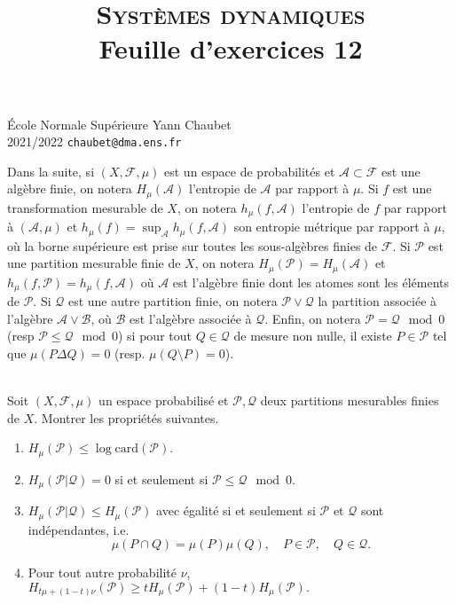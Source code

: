 \documentclass[a4paper,10pt,openany]{article}
\title{\textsc{Syst\`emes dynamiques} \\ Feuille d'exercices 12}
\date{}
\author{}
\theoremstyle{plain}
\theoremstyle{definition}
\begin{document}
{\noindent \'Ecole Normale Sup\'erieure  \hfill Yann Chaubet } \\
{2021/2022 \hfill \texttt{chaubet@dma.ens.fr}}

{\let\newpage\relax\maketitle}
\maketitle

Dans la suite, si $(X, \mathcal{F}, \mu)$ est un espace de probabilit\'es et $\mathcal{A} \subset \mathcal{F}$ est une alg\`ebre finie, on notera $H_\mu(\mathcal{A})$ l'entropie de $\mathcal{A}$ par rapport \`a $\mu$. Si $f$ est une transformation mesurable de $X$, on notera $h_\mu(f, \mathcal{A})$ l'entropie de $f$ par rapport \`a $(\mathcal{A},\mu)$ et $h_\mu(f) = \sup_{\mathcal{A}} h_\mu(f,\mathcal{A})$ son entropie m\'etrique par rapport \`a $\mu$, o\`u la borne sup\'erieure est prise sur toutes les sous-alg\`ebres finies de $\mathcal{F}$. Si $\mathcal{P}$ est une partition mesurable finie de $X$, on notera $H_\mu(\mathcal{P}) = H_\mu(\mathcal{A})$ et $h_\mu(f, \mathcal{P}) = h_\mu(f, \mathcal{A})$ o\`u $\mathcal{A}$ est l'alg\`ebre finie dont les atomes sont les \'el\'ements de $\mathcal{P}$. Si $\mathcal{Q}$ est une autre partition finie, on notera $\mathcal{P} \vee \mathcal{Q}$ la partition associ\'ee \`a l'alg\`ebre $\mathcal{A} \vee \mathcal{B}$, o\`u $\mathcal{B}$ est l'alg\`ebre associ\'ee \`a $\mathcal{Q}$. Enfin, on notera $\mathcal{P} = \mathcal{Q} \mod 0$ (resp $\mathcal{P} \leq \mathcal{Q} \mod 0$) si pour tout $Q \in \mathcal{Q}$ de mesure non nulle, il existe $P \in \mathcal{P}$ tel que $\mu(P \Delta Q) = 0$ (resp. $\mu(Q \setminus P) = 0$).
 \\ \\

 \vspace{1.5mm} 

\noindent Soit $(X,\mathcal{F},\mu)$ un espace probabilis\'e et $\mathcal{P}, \mathcal{Q}$ deux partitions mesurables finies de $X$. Montrer les propri\'et\'es suivantes.
\begin{enumerate}
\item $H_\mu(\mathcal{P}) \leq \log \mathrm{card} (\mathcal{P})$.
\item $H_\mu(\mathcal{P}| \mathcal{Q}) = 0$ si et seulement si $\mathcal{P}\leq \mathcal{Q} \mod 0$.
\item $H_\mu(\mathcal{P}| \mathcal{Q}) \leq H_\mu(\mathcal{P})$ avec \'egalit\'e si et seulement si $\mathcal{P}$ et $\mathcal{Q}$ sont ind\'ependantes, i.e.
$$
\mu(P\cap Q) = \mu(P)\mu(Q), \quad P \in \mathcal{P}, \quad Q \in \mathcal{Q}.
$$
\item Pour tout autre probabilit\'e $\nu$, $H_{t\mu+(1-t)\nu}(\mathcal{P}) \geq t H_\mu(\mathcal{P}) + (1-t)H_\mu(\mathcal{P}).$
\end{enumerate}
\vspace{0.6cm}
\end{document}
